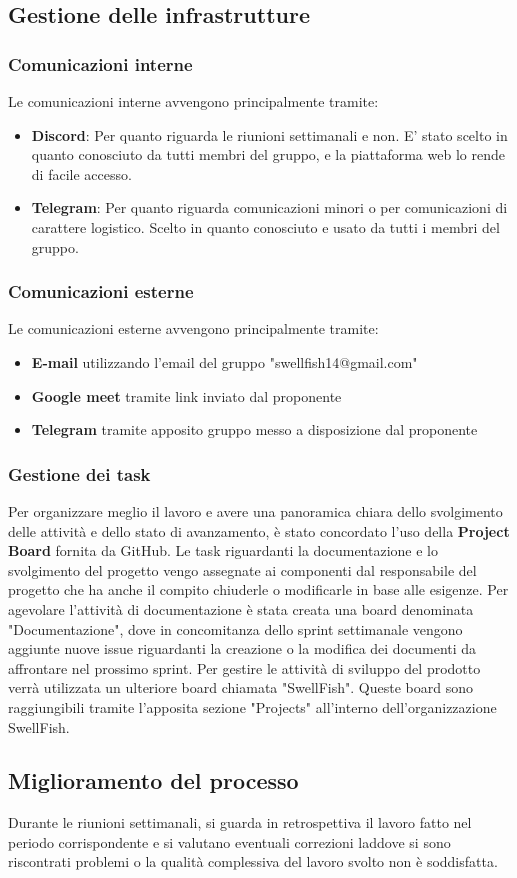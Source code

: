 \documentclass[12pt]{article}
\begin{document}
\subsection{Gestione delle infrastrutture}
\subsubsection{Comunicazioni interne}
Le comunicazioni interne avvengono principalmente tramite:
\begin{itemize}
    \item \textbf{Discord}: Per quanto riguarda le riunioni settimanali e non. E' stato scelto in quanto conosciuto da tutti membri del gruppo, e la piattaforma web lo rende di facile accesso.
    \item \textbf{Telegram}: Per quanto riguarda comunicazioni minori o per comunicazioni di carattere logistico. Scelto in quanto conosciuto e usato da tutti i membri del gruppo.
\end{itemize}

\subsubsection{Comunicazioni esterne}
Le comunicazioni esterne avvengono principalmente tramite:
\begin{itemize}
    \item \textbf{E-mail} utilizzando l'email del gruppo "swellfish14@gmail.com"
    \item \textbf{Google meet} tramite link inviato dal proponente
    \item \textbf{Telegram} tramite apposito gruppo messo a disposizione dal proponente
\end{itemize}

\subsubsection{Gestione dei task}
Per organizzare meglio il lavoro e avere una panoramica chiara dello svolgimento delle attività e dello stato di avanzamento, è stato concordato l'uso della \textbf{Project Board} fornita da GitHub.
Le task riguardanti la documentazione e lo svolgimento del progetto vengo assegnate ai componenti dal responsabile del progetto che ha anche il compito chiuderle o modificarle in base alle esigenze.
Per agevolare l'attività di documentazione è stata creata una board denominata "Documentazione", dove in concomitanza dello sprint settimanale vengono aggiunte nuove issue riguardanti la creazione o la modifica dei documenti da affrontare nel prossimo sprint.
Per gestire le attività di sviluppo del prodotto verrà utilizzata un ulteriore board chiamata "SwellFish".
Queste board sono raggiungibili tramite l'apposita sezione "Projects" all'interno dell'organizzazione SwellFish.


\subsection{Miglioramento del processo}
Durante le riunioni settimanali, si guarda in retrospettiva il lavoro fatto nel periodo corrispondente e si valutano eventuali correzioni laddove si sono riscontrati problemi o la qualità complessiva del lavoro svolto non è soddisfatta.
\end{document}
